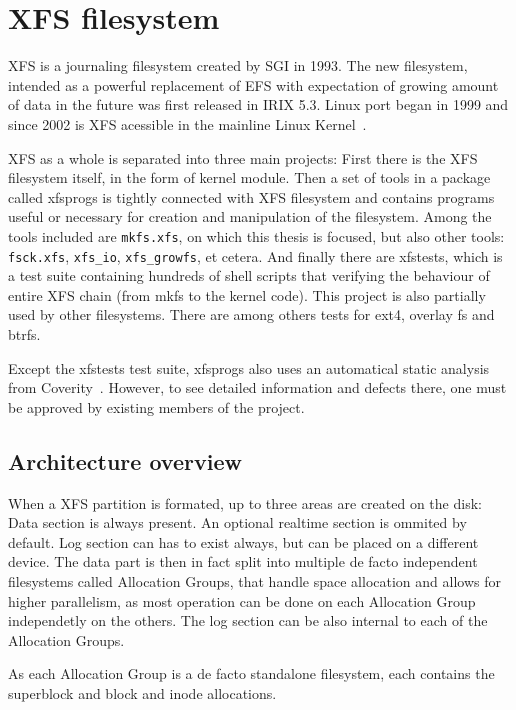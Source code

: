 
\chapter{XFS filesystem}

XFS is a journaling filesystem created by SGI in 1993. The new filesystem, intended as a powerful replacement of EFS with expectation of growing amount of data in the future was first released in IRIX 5.3. Linux port began in 1999 and since 2002 is XFS acessible in the mainline Linux Kernel~\cite[Chap. 1.2, 1.3]{xfsHistory}.

XFS as a whole is separated into three main projects: First there is the XFS filesystem itself, in the form of kernel module. Then a set of tools in a package called xfsprogs is tightly connected with XFS filesystem and contains programs useful or necessary for creation and manipulation of the filesystem. Among the tools included are {\tt mkfs.xfs}, on which this thesis is focused, but also other tools: {\tt fsck.xfs}, {\tt xfs\_io}, {\tt xfs\_growfs}, et cetera. And finally there are xfstests, which is a test suite containing hundreds of shell scripts that verifying the behaviour of entire XFS chain (from mkfs to the kernel code). This project is also partially used by other filesystems. There are among others tests for ext4, overlay fs and btrfs.

Except the xfstests test suite, xfsprogs also uses an automatical static analysis from Coverity~\cite{CoverityXfsprogs}. However, to see detailed information and defects there, one must be approved by existing members of the project.


\section{Architecture overview}
When a XFS partition is formated, up to three areas are created on the disk: Data section is always present. An optional realtime section is ommited by default. Log section can has to exist always, but can be placed on a different device. The data part is then in fact split into multiple de facto independent filesystems called Allocation Groups, that handle space allocation and allows for higher parallelism, as most operation can be done on each Allocation Group independetly on the others. The log section can be also internal to each of the Allocation Groups.

As each Allocation Group is a de facto standalone filesystem, each contains the superblock and block and inode allocations.

